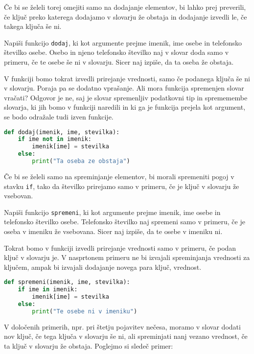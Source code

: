 Če bi se želeli torej omejiti samo na dodajanje elementov, bi lahko prej preverili, če ključ preko katerega dodajamo v slovarju že obstaja in dodajanje izvedli le, če takega ključa še ni.
\begin{zgled}
Napiši funkcijo \texttt{dodaj}, ki kot argumente prejme imenik, ime osebe in telefonsko številko osebe. Osebo in njeno telefonsko številko naj v slovar doda samo v primeru, če te osebe še ni v slovarju. Sicer naj izpiše, da ta oseba že obstaja.
\end{zgled}
\begin{resitev}
V funkciji bomo tokrat izvedli prirejanje vrednosti, samo če podanega ključa še ni v slovarju. Poraja pa se dodatno vprašanje. Ali mora funkcija spremenjen slovar vračati? Odgovor je ne, saj je slovar spremenljiv podatkovni tip in sprememembe slovarja, ki jih bomo v funkciji naredili in ki ga je funkcija prejela kot argument, se bodo odražale tudi izven funkcije.
\begin{lstlisting}[language=Python, showstringspaces=false]
def dodaj(imenik, ime, stevilka):
    if ime not in imenik:
        imenik[ime] = stevilka
    else:
        print("Ta oseba ze obstaja")
\end{lstlisting}
\end{resitev}

Če bi se želeli samo na spreminjanje elementov, bi morali spremeniti pogoj v stavku \texttt{if}, tako da številko prirejamo samo v primeru, če je ključ v slovarju že vsebovan.
\begin{zgled}
Napiši funkcijo \texttt{spremeni}, ki kot argumente prejme imenik, ime osebe in telefonsko številko osebe. Telefonsko številko naj spremeni samo v primeru, če je oseba v imeniku že vsebovana. Sicer naj izpiše, da te osebe v imeniku ni.
\end{zgled}
\begin{resitev}
Tokrat bomo v funkciji izvedli prirejanje vrednosti samo v primeru, če podan ključ v slovarju je. V nasprtonem primeru ne bi izvajali spreminjanja vrednosti za ključem, ampak bi izvajali dodajanje novega para ključ, vrednost.
\begin{lstlisting}[language=Python, showstringspaces=false]
def spremeni(imenik, ime, stevilka):
    if ime in imenik:
        imenik[ime] = stevilka
    else:
        print("Te osebe ni v imeniku")
\end{lstlisting}
\end{resitev}

V določenih primerih, npr. pri štetju pojavitev nečesa, moramo v slovar dodati nov ključ, če tega ključa v slovarju še ni, ali spreminjati nanj vezano vrednost, če ta ključ v slovarju že obstaja. Poglejmo si sledeč primer:

